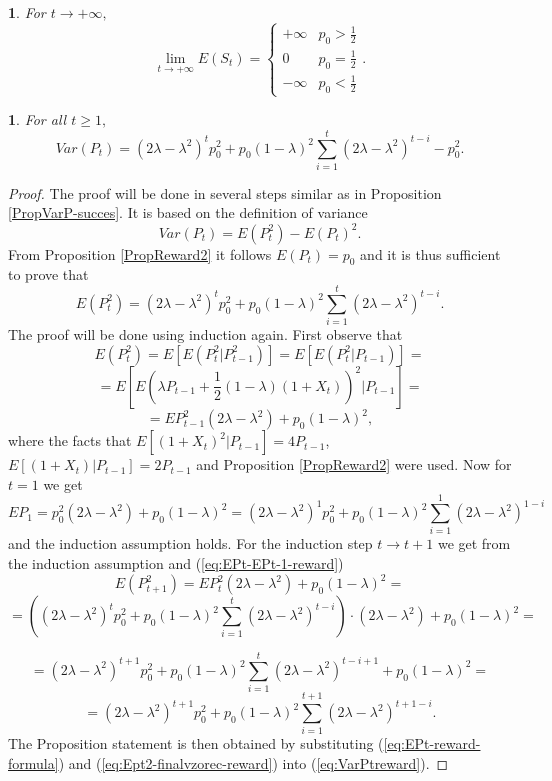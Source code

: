 \documentclass{amsart}
\theoremstyle{definition}
\theoremstyle{plain}
\newtheorem{prop}{\protect\propositionname}[section]
\theoremstyle{plain}
\newtheorem{cor}{\protect\corollaryname}
\numberwithin{equation}{section}
\providecommand{\corollaryname}{Corollary}
\providecommand{\propositionname}{Proposition}
\begin{document}
\begin{cor}
For $t\rightarrow+\infty,$ \textup{
\[
\lim_{t\to+\infty}E(S_{t})=\begin{cases}
+\infty & p_{0}>\frac{1}{2}\\
0 & p_{0}=\frac{1}{2}\\
-\infty & p_{0}<\frac{1}{2}
\end{cases}.
\]
}
\end{cor}

\begin{prop}
For all $t\geq1,$ 
\begin{equation}
Var(P_{t})=(2\lambda-\lambda^{2})^{t}p_{0}^{2}+p_{0}(1-\lambda)^{2}\sum_{i=1}^{t}(2\lambda-\lambda^{2})^{t-i}-p_{0}^{2}.\label{eq:VarPt-reward-prop}
\end{equation}
\end{prop}
\begin{proof}
The proof will be done in several steps similar as in Proposition
\ref{PropVarP-succes}. It is based on the definition of variance
\begin{equation}
Var(P_{t})=E(P_{t}^{2})-E(P_{t})^{2}.\label{eq:VarPtreward}
\end{equation}
From Proposition \ref{PropReward2} it follows $E(P_{t})=p_{0}$ and
it is thus sufficient to prove that 
\begin{equation}
E(P_{t}^{2})=(2\lambda-\lambda^{2})^{t}p_{0}^{2}+p_{0}(1-\lambda)^{2}\sum_{i=1}^{t}(2\lambda-\lambda^{2})^{t-i}.\label{eq:Ept2-finalvzorec-reward}
\end{equation}
The proof will be done using induction again. First observe that
\[
E(P_{t}^{2})=E[E(P_{t}^{2}|P_{t-1}^{2})]=E[E(P_{t}^{2}|P_{t-1})]=
\]
\[
=E[E(\lambda P_{t-1}+\frac{1}{2}(1-\lambda)(1+X_{t}))^{2}|P_{t-1}]=
\]
\begin{equation}
=EP_{t-1}^{2}(2\lambda-\lambda^{2})+p_{0}(1-\lambda)^{2},\label{eq:EPt-EPt-1-reward}
\end{equation}
where the facts that $E[(1+X_{t})^{2}|P_{t-1}]=4P_{t-1}$, $E[(1+X_{t})|P_{t-1}]=2P_{t-1}$
and Proposition \ref{PropReward2} were used. Now for $t=1$ we get
\[
EP_{1}=p_{0}^{2}(2\lambda-\lambda^{2})+p_{0}(1-\lambda)^{2}=(2\lambda-\lambda^{2})^{1}p_{0}^{2}+p_{0}(1-\lambda)^{2}\sum_{i=1}^{1}(2\lambda-\lambda^{2})^{1-i}
\]
and the induction assumption holds. For the induction step $t\rightarrow t+1$
we get from the induction assumption and (\ref{eq:EPt-EPt-1-reward})
\[
E(P_{t+1}^{2})=EP_{t}^{2}(2\lambda-\lambda^{2})+p_{0}(1-\lambda)^{2}=
\]
\[
=((2\lambda-\lambda^{2})^{t}p_{0}^{2}+p_{0}(1-\lambda)^{2}\sum_{i=1}^{t}(2\lambda-\lambda^{2})^{t-i})\cdot(2\lambda-\lambda^{2})+p_{0}(1-\lambda)^{2}=
\]
 
\[
=(2\lambda-\lambda^{2})^{t+1}p_{0}^{2}+p_{0}(1-\lambda)^{2}\sum_{i=1}^{t}(2\lambda-\lambda^{2})^{t-i+1}+p_{0}(1-\lambda)^{2}=
\]
\[
=(2\lambda-\lambda^{2})^{t+1}p_{0}^{2}+p_{0}(1-\lambda)^{2}\sum_{i=1}^{t+1}(2\lambda-\lambda^{2})^{t+1-i}.
\]
The Proposition statement is then obtained by substituting (\ref{eq:EPt-reward-formula})
and (\ref{eq:Ept2-finalvzorec-reward}) into (\ref{eq:VarPtreward}).
\end{proof}
\end{document}

